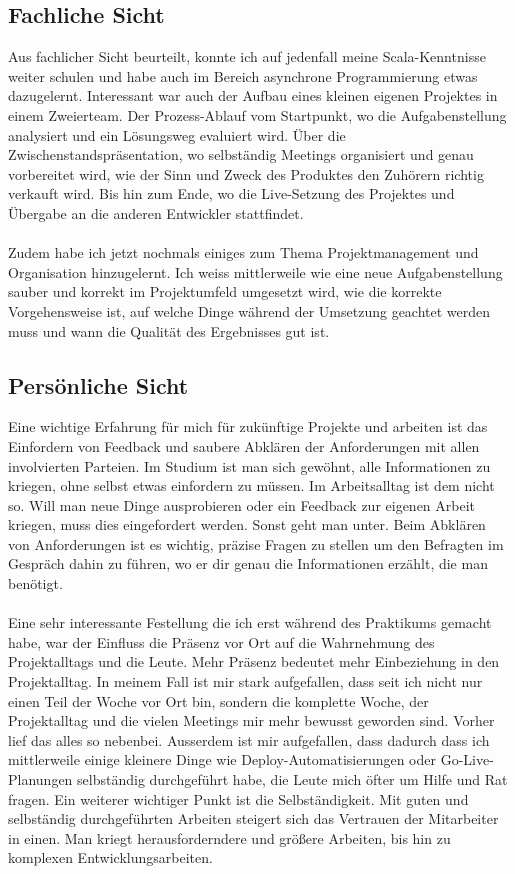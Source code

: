 \subsection{Fachliche Sicht}
\label{sec:Fazit:BP:FS}

Aus fachlicher Sicht beurteilt, konnte ich auf jedenfall meine Scala-Kenntnisse weiter schulen und habe auch im Bereich asynchrone Programmierung etwas dazugelernt. Interessant war auch der Aufbau eines kleinen eigenen Projektes in einem Zweierteam. Der Prozess-Ablauf vom Startpunkt, wo die Aufgabenstellung analysiert und ein Lösungsweg evaluiert wird. Über die Zwischenstandspräsentation, wo selbständig Meetings organisiert und genau vorbereitet wird, wie der Sinn und Zweck des Produktes den Zuhörern richtig verkauft wird. Bis hin zum Ende, wo die Live-Setzung des Projektes und Übergabe an die anderen Entwickler stattfindet. 
\\
\\
Zudem habe ich jetzt nochmals einiges zum Thema Projektmanagement und Organisation hinzugelernt. Ich weiss mittlerweile wie eine neue Aufgabenstellung sauber und korrekt im Projektumfeld umgesetzt wird, wie die korrekte Vorgehensweise ist, auf welche Dinge während der Umsetzung geachtet werden muss und wann die Qualität des Ergebnisses gut ist. 

\subsection{Persönliche Sicht}
\label{sec:Fazit:BP:PS}

Eine wichtige Erfahrung für mich für zukünftige Projekte und arbeiten ist das Einfordern von Feedback und saubere Abklären der Anforderungen mit allen involvierten Parteien. Im Studium ist man sich gewöhnt, alle Informationen zu kriegen, ohne selbst etwas einfordern zu müssen. Im Arbeitsalltag ist dem nicht so. Will man neue Dinge ausprobieren oder ein Feedback zur eigenen Arbeit kriegen, muss dies eingefordert werden. Sonst geht man unter. Beim Abklären von Anforderungen ist es wichtig, präzise Fragen zu stellen um den Befragten im Gespräch dahin zu führen, wo er dir genau die Informationen erzählt, die man benötigt. 
\\
\\
Eine sehr interessante Festellung die ich erst während des Praktikums gemacht habe, war der Einfluss die Präsenz vor Ort auf die Wahrnehmung des Projektalltags und die Leute. Mehr Präsenz bedeutet mehr Einbeziehung in den Projektalltag. In meinem Fall ist mir stark aufgefallen, dass seit ich nicht nur einen Teil der Woche vor Ort bin, sondern die komplette Woche, der Projektalltag und die vielen Meetings mir mehr bewusst geworden sind. Vorher lief das alles so nebenbei. Ausserdem ist mir aufgefallen, dass dadurch dass ich mittlerweile einige kleinere Dinge wie Deploy-Automatisierungen oder Go-Live-Planungen selbständig durchgeführt habe, die Leute mich öfter um Hilfe und Rat fragen. Ein weiterer wichtiger Punkt ist die Selbständigkeit. Mit guten und selbständig durchgeführten Arbeiten steigert sich das Vertrauen der Mitarbeiter in einen. Man kriegt herausforderndere und größere Arbeiten, bis hin zu komplexen Entwicklungsarbeiten.

